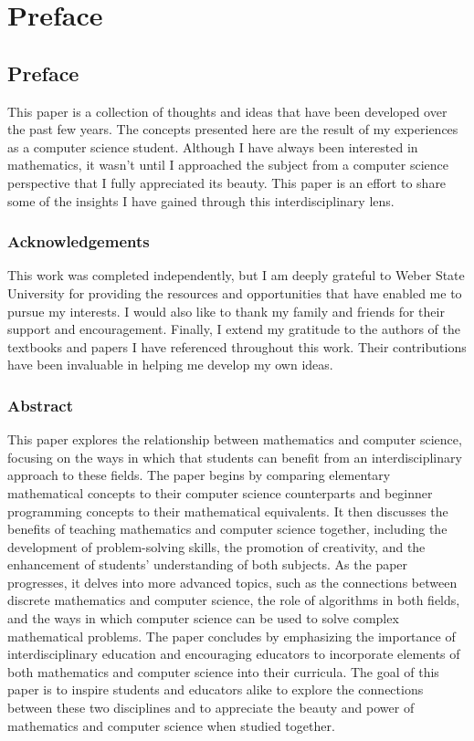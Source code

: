 \chapter{Preface}
\section{Preface}\label{sec:preface}

This paper is a collection of thoughts and ideas that have been developed over the past few years. The concepts presented here are the result of my experiences as a computer science student. Although I have always been interested in mathematics, it wasn't until I approached the subject from a computer science perspective that I fully appreciated its beauty. This paper is an effort to share some of the insights I have gained through this interdisciplinary lens.

\subsection{Acknowledgements}

This work was completed independently, but I am deeply grateful to Weber State University for providing the resources and opportunities that have enabled me to pursue my interests. I would also like to thank my family and friends for their support and encouragement. Finally, I extend my gratitude to the authors of the textbooks and papers I have referenced throughout this work. Their contributions have been invaluable in helping me develop my own ideas.

\subsection{Abstract}

This paper explores the relationship between mathematics and computer science, focusing on the ways in which that students can benefit from an interdisciplinary approach to these fields. The paper begins by comparing elementary mathematical concepts to their computer science counterparts and beginner programming concepts to their mathematical equivalents. It then discusses the benefits of teaching mathematics and computer science together, including the development of problem-solving skills, the promotion of creativity, and the enhancement of students' understanding of both subjects. As the paper progresses, it delves into more advanced topics, such as the connections between discrete mathematics and computer science, the role of algorithms in both fields, and the ways in which computer science can be used to solve complex mathematical problems. The paper concludes by emphasizing the importance of interdisciplinary education and encouraging educators to incorporate elements of both mathematics and computer science into their curricula. The goal of this paper is to inspire students and educators alike to explore the connections between these two disciplines and to appreciate the beauty and power of mathematics and computer science when studied together.

